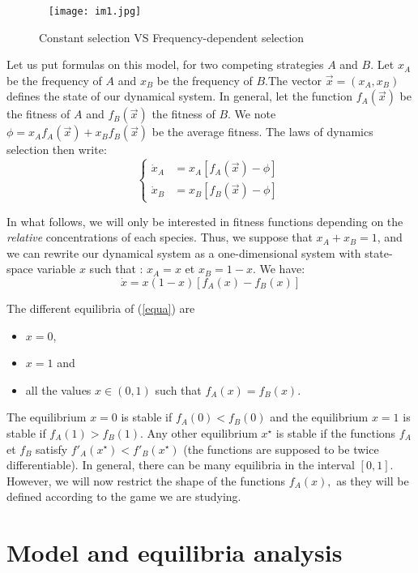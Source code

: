 \begin{figure}[hbtp] \
\centering
\texttt{[image: im1.jpg]}
\caption{Constant selection VS Frequency-dependent selection}
\label{frequency}
\end{figure}
Let us put formulas on this model, for two competing strategies $A$ and $B.$ Let  $x_A$ be the frequency of $A$ and $x_B$ be the frequency of $B.$The vector $\overrightarrow{x} = (x_A,x_B)$ defines the state of our dynamical system. In general, let the function $f_A(\overrightarrow{x})$ be the fitness of $A$ and $f_B(\overrightarrow{x})$ the fitness of $B.$ We note $\phi = x_A f_A(\overrightarrow{x})+ x_B f_B(\overrightarrow{x})$ be the average fitness. The laws of dynamics selection then write:
\begin{equation}
\begin{cases}
\dot{x}_A &= x_A \left[ f_A(\overrightarrow{x})-\phi \right] \\
\dot{x}_B &= x_B \left[ f_B(\overrightarrow{x})-\phi \right] \
\end{cases}
\label{syst}
\end{equation}

In what follows, we will only be interested in fitness functions depending on the \emph{relative} concentrations of each species.  Thus, we suppose that $x_A + x_B = 1$, and we can rewrite our dynamical system as a one-dimensional system with state-space variable $x$ such that : $x_A = x$ et $x_B = 1-x$. We have:
\begin{equation}
\dot{x} = x(1-x) \left[ f_A(x) - f_B(x) \right] \label{equa}
\end{equation}

The different equilibria of (\ref{equa}) are
\begin{itemize}
\item $x=0$, \item $x=1$ and \item all the values $x \in (0,1)$ such that $f_A(x) = f_B(x)$.\end{itemize} The equilibrium $x=0$ is stable if $f_A(0) < f_B(0)$ and the equilibrium $x=1$ is stable if $f_A(1) > f_B(1)$. Any other equilibrium $x^{\star}$ is stable if the functions $f_A$ et $f_B$ satisfy $f'_A(x^{\star}) < f'_B(x^{\star})$ (the functions are supposed to be twice differentiable). In general, there can be many equilibria in the interval $\left[ 0,1 \right].$ However, we will now restrict the shape of the functions $f_A(x),$ as they will be defined according to the game we are studying.
\section{Model and equilibria analysis}

